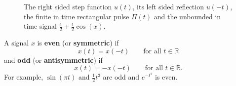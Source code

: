 \documentclass[11pt,a4paper]{book}
\theoremstyle{plain}
\numberwithin{equation}{section}
\newcommand{\reals}{{\mathbb R}}
\newcommand{\term}{\textbf}
\begin{document}
\begin{figure}[tp]
\caption{The right sided step function $u(t)$, its left sided reflection $u(-t)$, the finite in time rectangular pulse $\Pi(t)$ and the unbounded in time signal $\tfrac{1}{2} + \tfrac{1}{2}\cos(x)$.  %
} 
\label{fig:stepsided}
\end{figure}

A signal $x$ is \term{even} (or \term{symmetric}) if
\[
x(t) = x(-t) \qquad  \text{for all $t \in \reals$}
\] 
and \term{odd} (or \term{antisymmetric}) if 
\[
x(t) = -x(-t) \qquad \text{for all $t \in \reals$}.
\] 
For example, $\sin(\pi t)$ and $\tfrac{1}{2}t^3$ are odd and $e^{-t^2}$ is even.  %
\end{document}
